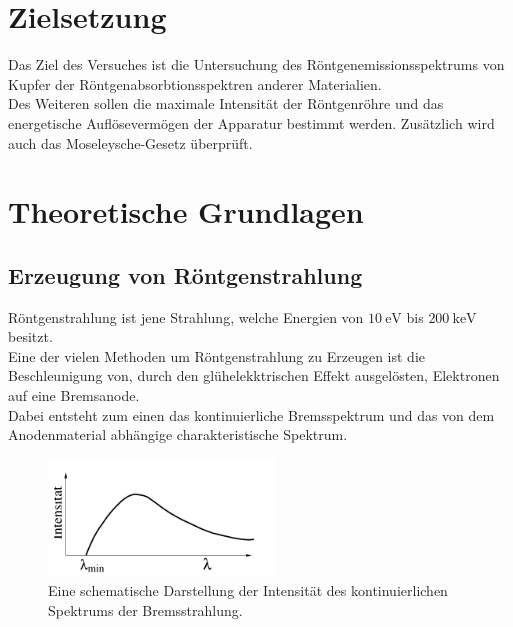 \newpage
\section{Zielsetzung}
    Das Ziel des Versuches ist die Untersuchung des Röntgenemissionsspektrums  von Kupfer der
    Röntgenabsorbtionsspektren anderer Materialien.\\ Des Weiteren sollen die maximale Intensität der Röntgenröhre und das energetische Auflösevermögen der Apparatur bestimmt werden.
    Zusätzlich wird auch das Moseleysche-Gesetz überprüft.

\section{Theoretische Grundlagen }

\subsection{Erzeugung von Röntgenstrahlung}

Röntgenstrahlung ist jene Strahlung, welche Energien von $\SI{10}{\eV}$ bis $\SI{200}{\kilo\eV}$ besitzt.\\
Eine der vielen Methoden um Röntgenstrahlung zu Erzeugen ist die Beschleunigung von, durch den glühelekktrischen Effekt ausgelösten, Elektronen auf eine Bremsanode.\\
Dabei entsteht zum einen das kontinuierliche Bremsspektrum und das  von dem Anodenmaterial abhängige charakteristische Spektrum.\\
\begin{figure}
    \centering
    \includegraphics[width=6cm]{latex/images/kurve1.PNG}
    \caption{Eine schematische Darstellung der Intensität des kontinuierlichen Spektrums der Bremsstrahlung\protect \cite{V602}.}
    \label{img:comp}
\end{figure}

